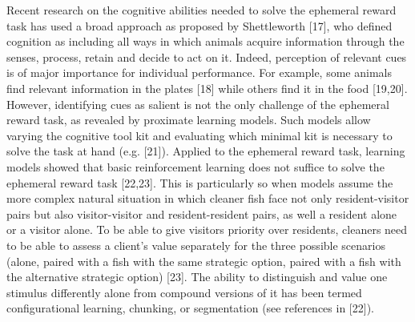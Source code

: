 \documentclass[10pt,letterpaper]{article}
\begin{document}
Recent research on the cognitive abilities needed to solve the ephemeral
reward task has used a broad approach as proposed by Shettleworth
{[}17{]}, who defined cognition as including all ways in which animals
acquire information through the senses, process, retain and decide to
act on it. Indeed, perception of relevant cues is of major importance
for individual performance. For example, some animals find relevant
information in the plates {[}18{]} while others find it in the food
{[}19,20{]}. However, identifying cues as salient is not the only
challenge of the ephemeral reward task, as revealed by proximate
learning models. Such models allow varying the cognitive tool kit and
evaluating which minimal kit is necessary to solve the task at hand
(e.g. {[}21{]}). Applied to the ephemeral reward task, learning models
showed that basic reinforcement learning does not suffice to solve the
ephemeral reward task {[}22,23{]}. This is particularly so when models
assume the more complex natural situation in which cleaner fish face not
only resident-visitor pairs but also visitor-visitor and
resident-resident pairs, as well a resident alone or a visitor alone. To
be able to give visitors priority over residents, cleaners need to be
able to assess a client's value separately for the three possible
scenarios (alone, paired with a fish with the same strategic option,
paired with a fish with the alternative strategic option) {[}23{]}. The
ability to distinguish and value one stimulus differently alone from
compound versions of it has been termed configurational learning,
chunking, or segmentation (see references in {[}22{]}).
\end{document}
